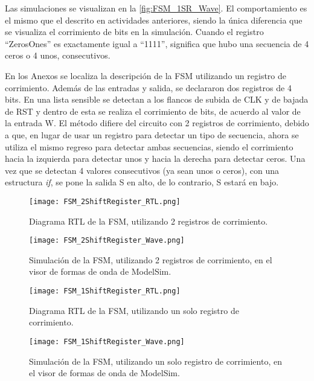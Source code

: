 Las simulaciones se visualizan en la \autoref{fig:FSM_1SR_Wave}. El comportamiento es el mismo que el descrito en actividades anteriores, siendo la única diferencia que se visualiza el corrimiento de bits en la simulación. Cuando el registro ``ZerosOnes'' es exactamente igual a ``1111'', significa que hubo una secuencia de 4 ceros o 4 unos, consecutivos.

En los Anexos se localiza la descripción de la FSM utilizando un registro de corrimiento. Además de las entradas y salida, se declararon dos registros de 4 bits. En una lista sensible se detectan a los flancos de subida de CLK y de bajada de RST y dentro de esta se realiza el corrimiento de bits, de acuerdo al valor de la entrada W. El método difiere del circuito con 2 registros de corrimiento, debido a que, en lugar de usar un registro para detectar un tipo de secuencia, ahora se utiliza el mismo regreso para detectar ambas secuencias, siendo el corrimiento hacia la izquierda para detectar unos y hacia la derecha para detectar ceros. Una vez que se detectan 4 valores consecutivos (ya sean unos o ceros), con una estructura \textit{if}, se pone la salida S en alto, de lo contrario, S estará en bajo.

\begin{figure}[ht]
	\centering
	\texttt{[image: FSM\_2ShiftRegister\_RTL.png]}
	\caption{Diagrama RTL de la FSM, utilizando 2 registros de corrimiento. \label{fig:FSM_2SR_RTL}}
\end{figure}

\begin{figure}[ht]
	\centering
	\texttt{[image: FSM\_2ShiftRegister\_Wave.png]}
	\caption{Simulación de la FSM, utilizando 2 registros de corrimiento, en el visor de formas de onda de ModelSim. \label{fig:FSM_2SR_Wave}}
\end{figure}

\begin{figure}[ht]
	\centering
	\texttt{[image: FSM\_1ShiftRegister\_RTL.png]}
	\caption{Diagrama RTL de la FSM, utilizando un solo registro de corrimiento. \label{fig:FSM_1SR_RTL}}
\end{figure}

\begin{figure}[ht]
	\centering
	\texttt{[image: FSM\_1ShiftRegister\_Wave.png]}
	\caption{Simulación de la FSM, utilizando un solo registro de corrimiento, en el visor de formas de onda de ModelSim. \label{fig:FSM_1SR_Wave}}
\end{figure}